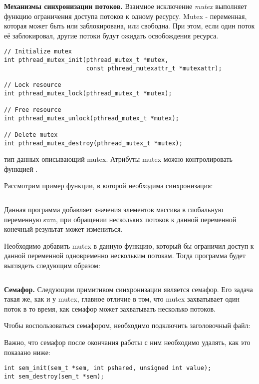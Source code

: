 \textbf{Механизмы синхронизации потоков.} Взаимное исключение \textit{mu\-tex} выполняет функцию ограничения доступа потоков к одному ресурсу. Mutex - переменная, которая может быть или заблокирована, или свободна. При этом, если один поток её заблокировал, другие потоки будут ожидать освобождения ресурса.

\begin{verbatim}
// Initialize mutex
int pthread_mutex_init(pthread_mutex_t *mutex, 
                       const pthread_mutexattr_t *mutexattr);

// Lock resource
int pthread_mutex_lock(pthread_mutex_t *mutex);

// Free resource
int pthread_mutex_unlock(pthread_mutex_t *mutex);

// Delete mutex
int pthread_mutex_destroy(pthread_mutex_t *mutex);
\end{verbatim}

 тип данных описывающий mutex. Атрибуты mutex можно контролировать функцией .

Рассмотрим пример функции, в которой необходима синхронизация:

\inputminted{c++}{listings/WithoutMutex.c}

Данная программа добавляет значения элементов массива в глобальную переменную sum, при обращении нескольких потоков к данной переменной конечный результат может измениться.

Необходимо добавить mutex в данную функцию, который бы ограничил доступ к данной переменной одновременно нескольким потокам. Тогда программа будет выглядеть следующим образом:

\inputminted{c++}{listings/WithMutex.c}

\textbf{Семафор.} Следующим примитивом синхронизации является семафор. Его задача такая же, как и у mutex, главное отличие в том, что mutex захватывает один поток в то время, как семафор может захватывать несколько потоков.

Чтобы воспользоваться семафором, необходимо подключить заголовочный файл:

Важно, что семафор после окончания работы с ним необходимо удалять, как это показано ниже:

\begin{verbatim}
int sem_init(sem_t *sem, int pshared, unsigned int value);
int sem_destroy(sem_t *sem);
\end{verbatim}

